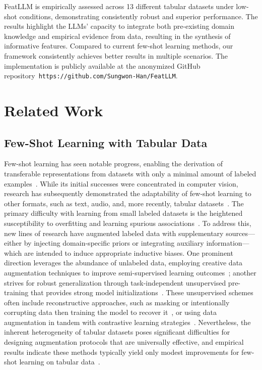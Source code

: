 \textsf{FeatLLM} is empirically assessed across 13 different tabular datasets under low-shot conditions, demonstrating consistently robust and superior performance. The results highlight the LLMs’ capacity to integrate both pre-existing domain knowledge and empirical evidence from data, resulting in the synthesis of informative features. Compared to current few-shot learning methods, our framework consistently achieves better results in multiple scenarios. The implementation is publicly available at the anonymized GitHub repository~\texttt{https://github.com/Sungwon-Han/FeatLLM}.

\section{Related Work}

\subsection{Few-Shot Learning with Tabular Data}

Few-shot learning has seen notable progress, enabling the derivation of transferable representations from datasets with only a minimal amount of labeled examples~\cite{chen2018closer}. While its initial successes were concentrated in computer vision, research has subsequently demonstrated the adaptability of few-shot learning to other formats, such as text, audio, and, more recently, tabular datasets~\cite{majumder2022few,nam2023stunt,schick2021exploiting}. The primary difficulty with learning from small labeled datasets is the heightened susceptibility to overfitting and learning spurious associations~\cite{bartlett2021deep}. To address this, new lines of research have augmented labeled data with supplementary sources—either by injecting domain-specific priors or integrating auxiliary information—which are intended to induce appropriate inductive biases. One prominent direction leverages the abundance of unlabeled data, employing creative data augmentation techniques to improve semi-supervised learning outcomes~\cite{ucar2021subtab,yoon2020vime}; another strives for robust generalization through task-independent unsupervised pre-training that provides strong model initializations~\cite{somepalli2021saint}. These unsupervised schemes often include reconstructive approaches, such as masking or intentionally corrupting data then training the model to recover it~\cite{arik2021tabnet,majmundar2022met}, or using data augmentation in tandem with contrastive learning strategies~\cite{bahri2022scarf,chen2020simple}. Nevertheless, the inherent heterogeneity of tabular datasets poses significant difficulties for designing augmentation protocols that are universally effective, and empirical results indicate these methods typically yield only modest improvements for few-shot learning on tabular data~\cite{nam2023stunt}.

